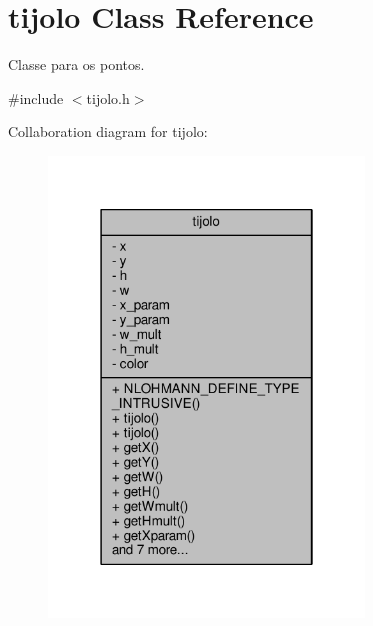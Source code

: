 \hypertarget{classtijolo}{}\section{tijolo Class Reference}
\label{classtijolo}


Classe para os pontos.  




{\ttfamily \#include $<$tijolo.\+h$>$}



Collaboration diagram for tijolo\+:
\nopagebreak
\begin{figure}[H]
\begin{center}
\leavevmode
\includegraphics[width=238pt]{classtijolo__coll__graph}
\end{center}
\end{figure}
